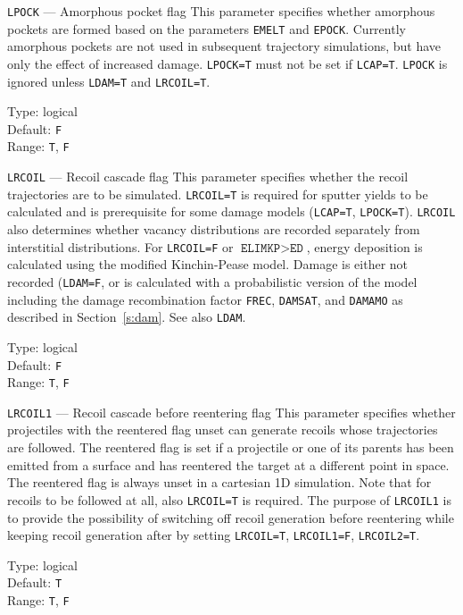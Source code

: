 \begin{keydescription}{\texttt{LPOCK} --- Amorphous pocket flag}
%
  This parameter specifies whether amorphous pockets are formed based on
  the parameters \texttt{EMELT} and \texttt{EPOCK}. Currently amorphous
  pockets are not used in subsequent trajectory simulations, but have
  only the effect of increased damage. \texttt{LPOCK=T} must not
  be set if \texttt{LCAP=T}. \texttt{LPOCK} is ignored unless \texttt{LDAM=T} 
  and \texttt{LRCOIL=T}.
  \begin{keytab}
    Type:    \> logical \\
    Default: \> \texttt{F} \\
    Range:   \> \texttt{T}, \texttt{F}
  \end{keytab}
\end{keydescription}

\begin{keydescription}{\texttt{LRCOIL} --- Recoil cascade flag}
%
  This parameter specifies whether the recoil trajectories are to be simulated. 
  \texttt{LRCOIL=T} is required for sputter yields to be calculated and is 
  prerequisite for some damage models (\texttt{LCAP=T},
  \texttt{LPOCK=T}). \texttt{LRCOIL} also determines whether vacancy 
  distributions are recorded separately from interstitial distributions. 
  For \texttt{LRCOIL=F} or $\texttt{ELIMKP}>\texttt{ED}$, energy deposition is
  calculated using the modified Kinchin-Pease model. Damage is either not
  recorded (\texttt{LDAM=F}, or is calculated with a probabilistic version of 
  the model including the damage recombination factor \texttt{FREC}, 
  \texttt{DAMSAT}, and \texttt{DAMAMO} as described in Section~\ref{s:dam}.
  See also \texttt{LDAM}. 
  \begin{keytab}
    Type:    \> logical \\
    Default: \> \texttt{F} \\
    Range:   \> \texttt{T}, \texttt{F}
  \end{keytab}
\end{keydescription}

\begin{keydescription}{\texttt{LRCOIL1} --- Recoil cascade before reentering
flag}
%
  This parameter specifies whether projectiles with the reentered flag unset can
  generate recoils whose trajectories are followed. The reentered flag is
  set if a projectile or one of its parents has been emitted from a surface
  and has reentered the target at a different point in space. The reentered flag
  is always unset in a cartesian 1D simulation. Note that for recoils to be
  followed at all, also \texttt{LRCOIL=T} is required. The purpose of
  \texttt{LRCOIL1} is to provide the possibility of switching off recoil
  generation before reentering while keeping recoil generation after by setting
  \texttt{LRCOIL=T}, \texttt{LRCOIL1=F}, \texttt{LRCOIL2=T}.
  \begin{keytab}
    Type:    \> logical \\
    Default: \> \texttt{T} \\
    Range:   \> \texttt{T}, \texttt{F}
  \end{keytab}
\end{keydescription}

